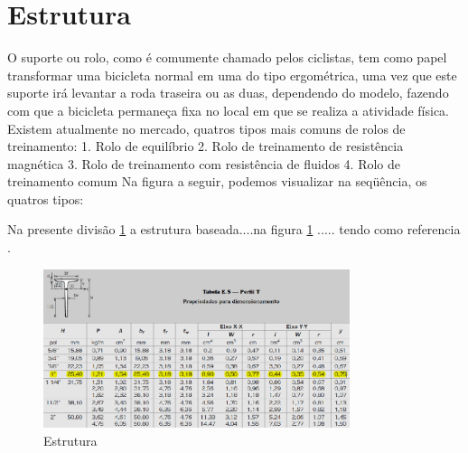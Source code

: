 \section{Estrutura} \label{Secao Estrutura}

O suporte ou rolo, como é comumente chamado pelos ciclistas, tem como papel transformar uma bicicleta normal em uma do tipo ergométrica, uma vez que este suporte irá levantar a roda traseira ou as duas, dependendo do modelo, fazendo com que a bicicleta permaneça fixa no local em que se realiza a atividade física.  Existem atualmente no mercado, quatros tipos mais comuns de rolos de treinamento:
1.	Rolo de equilíbrio
2.	Rolo de treinamento de resistência magnética
3.	Rolo de treinamento com resistência de fluidos
4.	Rolo de treinamento comum
Na figura a seguir, podemos visualizar na seqüência, os quatros tipos:



Na presente divisão \ref{Secao Estrutura}  a estrutura baseada....na figura \ref{fig:awesome_image} ..... tendo como referencia \cite{shigley2011shigley}.

\begin{figure}[h]
    \centering
    \includegraphics[width=0.8\textwidth]{figuras/perfil_t.png}
    \caption{Estrutura}
    \label{fig:awesome_image}
\end{figure}
